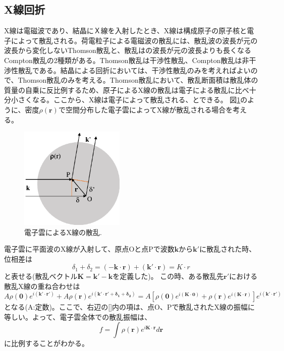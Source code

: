 \documentclass[11pt,a4j,uplatex]{jsarticle}
\begin{document}
\newpage
\subsection{X線回折}%
X線は電磁波であり、結晶にＸ線を入射したとき、X線は構成原子の原子核と電子によって散乱される。荷電粒子による電磁波の散乱には、散乱波の波長が元の波長から変化しないThomson散乱と、散乱はの波長が元の波長よりも長くなるCompton散乱の2種類がある。Thomson散乱は干渉性散乱、Compton散乱は非干渉性散乱である。結晶による回折においては、干渉性散乱のみを考えればよいので、Thomson散乱のみを考える。Thomson散乱において、散乱断面積は散乱体の質量の自乗に反比例するため、原子によるX線の散乱は電子による散乱に比べ十分小さくなる。ここから、X線は電子によって散乱される、とできる。
図\ref{sanran}のように、密度$\rho(\bm{r})$で空間分布した電子雲によってX線が散乱される場合を考える。
\begin{figure}[htb]
 \centering
 \includegraphics[clip,width=5cm]{sanran.eps}
 \caption{電子雲によるX線の散乱.}
 \label{sanran}
\end{figure}

電子雲に平面波のX線が入射して、原点Oと点Pで波数$\bm{k}$から$\bm{k}'$に散乱された時、位相差は
\begin{equation}
  \delta_1+\delta_2=\bm{(-k\cdot r)+(k'\cdot r)}=K\cdot r
\end{equation}
と表せる(散乱ベクトル$\bm{K=k'-k}$を定義した)。
この時、ある散乱先$\bm{r'}$における散乱X線の重ね合わせは
\begin{equation}
  A\rho\bm{(0)}e^{i(\bm{k'\cdot r'})}+  A\rho\bm{(r)}e^{i(\bm{k'\cdot r'+\delta_1+\delta_2})}=A[\rho\bm{(0)}e^{i(\bm{K\cdot 0})}+\rho\bm{(r)}e^{i(\bm{K\cdot r})}]e^{i(\bm{k'\cdot r'})}
\end{equation}
となる(A:定数)。ここで、右辺の[]内の項は、点O、Pで散乱されたX線の振幅に等しい。よって、電子雲全体での散乱振幅は、
\begin{equation}
  f=\int\rho(\bm{r})e^{i\bm{K\cdot r}}d\bm{r}
  \label{insi}
\end{equation}
に比例することがわかる。
\end{document}
